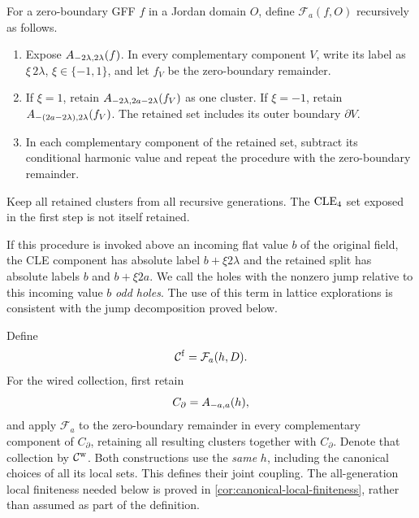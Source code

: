 \begin{definition}\label{def:free-procedure}
For a zero-boundary GFF \(f\) in a Jordan domain \(O\), define
\(\mathcal F_a(f,O)\) recursively as follows.
\begin{enumerate}
\item Expose \(A_{-2\lambda,2\lambda}(f)\). In every complementary
component \(V\), write its label as \(\xi\,2\lambda\),
\(\xi\in\{-1,1\}\), and let \(f_V\) be the zero-boundary remainder.
\item If \(\xi=1\), retain
\(A_{-2\lambda,2a-2\lambda}(f_V)\) as one cluster. If \(\xi=-1\),
retain \(A_{-(2a-2\lambda),2\lambda}(f_V)\).
The retained set includes its outer boundary \(\partial V\).
\item In each complementary component of the retained set, subtract its
conditional harmonic value and repeat the procedure with the
zero-boundary remainder.
\end{enumerate}
Keep all retained clusters from all recursive generations. The
\(\mathrm{CLE}_4\) set exposed in the first step is not itself retained.
\end{definition}

If this procedure is invoked above an incoming flat value \(b\) of the
original field, the CLE component has absolute label \(b+\xi2\lambda\)
and the retained split has absolute labels \(b\) and \(b+\xi2a\).
We call the holes with the nonzero jump relative to this incoming value
\(b\) \emph{odd holes}.
The use of this term in lattice explorations is consistent with the
jump decomposition proved below.

Define
\[
 \mathcal C^{\rm f}=\mathcal F_a(h,D).
\]
For the wired collection, first retain
\[
 C_\partial=A_{-a,a}(h),
\]
and apply \(\mathcal F_a\) to the zero-boundary remainder in every
complementary component of \(C_\partial\), retaining all resulting
clusters together with \(C_\partial\). Denote that collection by
\(\mathcal C^{\rm w}\). Both constructions use the \emph{same} \(h\), including
the canonical choices of all its local sets. This defines their joint
coupling. The all-generation local finiteness needed below is proved
in \cref{cor:canonical-local-finiteness}, rather than assumed as part of the
definition.

